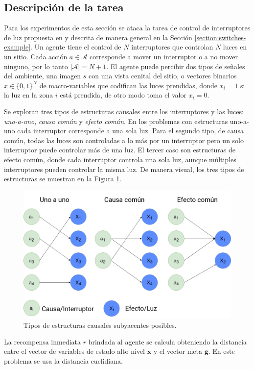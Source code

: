 \subsection{Descripción de la tarea}
Para los experimentos de esta sección se ataca la tarea de control de interruptores de luz propuesta en \cite{nair2019causal} y descrita de manera general en la Sección \ref{section:switches-example}. Un agente tiene el control
de $N$ interruptores que controlan $N$ luces en un sitio.
Cada acción $a\in \mathcal{A}$ corresponde a mover un interruptor o 
a no mover ninguno, por lo tanto $|\mathcal{A}| = N + 1$.
El agente puede percibir dos tipos de señales del ambiente,
una imagen $s$ con una vista cenital del sitio, o vectores binarios $x \in \{0,1\}^N$ de 
macro-variables que codifican las luces prendidas, donde
$x_i = 1$ si la luz en la zona $i$ está prendida, de otro modo 
toma el valor $x_i = 0$.

Se exploran tres tipos de estructuras causales entre los
interruptores y las luces: \textit{uno-a-uno},
\textit{causa común} y \textit{efecto común}.
En los problemas con estructuras uno-a-uno cada interruptor corresponde a una sola luz.
Para el segundo tipo, de causa común, todas
las luces son controladas a lo más por un interruptor pero un
solo interruptor puede controlar más de una luz.
El tercer caso son estructuras de efecto común, donde cada interruptor
controla una sola luz, aunque múltiples interruptores
pueden controlar la misma luz. De manera visual, los tres tipos de estructuras
se muestran en la Figura \ref{fig:struct}.

\begin{figure}[H]
    \centering
    \includegraphics[scale=0.2]{Chapter5/Figs/switches_struct.png}
    \caption{Tipos de estructuras causales subyacentes posibles.}
    \label{fig:struct}
\end{figure}
La recompensa inmediata $r$ brindada al agente se calcula obteniendo la distancia entre el vector de variables de estado alto nivel $\mathbf{x}$ y el vector meta $\mathbf{g}$. En este problema se usa la distancia euclidiana.


